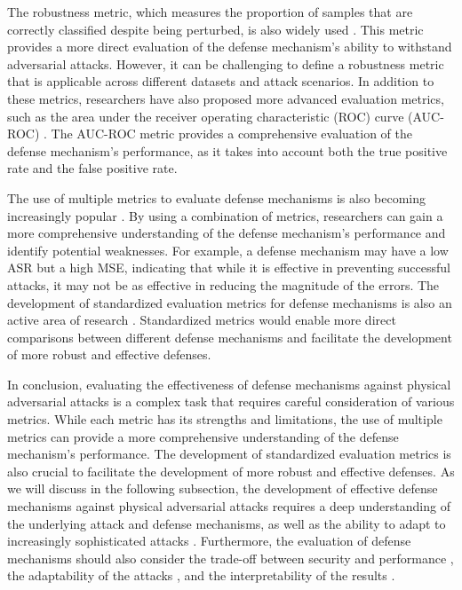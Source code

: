 \documentclass[11pt]{article}
\begin{document}
The robustness metric, which measures the proportion of samples that are correctly classified despite being perturbed, is also widely used \cite{ref46}. This metric provides a more direct evaluation of the defense mechanism's ability to withstand adversarial attacks. However, it can be challenging to define a robustness metric that is applicable across different datasets and attack scenarios. In addition to these metrics, researchers have also proposed more advanced evaluation metrics, such as the area under the receiver operating characteristic (ROC) curve (AUC-ROC) \cite{ref109}. The AUC-ROC metric provides a comprehensive evaluation of the defense mechanism's performance, as it takes into account both the true positive rate and the false positive rate.

The use of multiple metrics to evaluate defense mechanisms is also becoming increasingly popular \cite{ref110}. By using a combination of metrics, researchers can gain a more comprehensive understanding of the defense mechanism's performance and identify potential weaknesses. For example, a defense mechanism may have a low ASR but a high MSE, indicating that while it is effective in preventing successful attacks, it may not be as effective in reducing the magnitude of the errors. The development of standardized evaluation metrics for defense mechanisms is also an active area of research \cite{ref111}. Standardized metrics would enable more direct comparisons between different defense mechanisms and facilitate the development of more robust and effective defenses.

In conclusion, evaluating the effectiveness of defense mechanisms against physical adversarial attacks is a complex task that requires careful consideration of various metrics. While each metric has its strengths and limitations, the use of multiple metrics can provide a more comprehensive understanding of the defense mechanism's performance. The development of standardized evaluation metrics is also crucial to facilitate the development of more robust and effective defenses. As we will discuss in the following subsection, the development of effective defense mechanisms against physical adversarial attacks requires a deep understanding of the underlying attack and defense mechanisms, as well as the ability to adapt to increasingly sophisticated attacks \cite{ref112}. Furthermore, the evaluation of defense mechanisms should also consider the trade-off between security and performance \cite{ref65}, the adaptability of the attacks \cite{ref113}, and the interpretability of the results \cite{ref114}.
\end{document}

